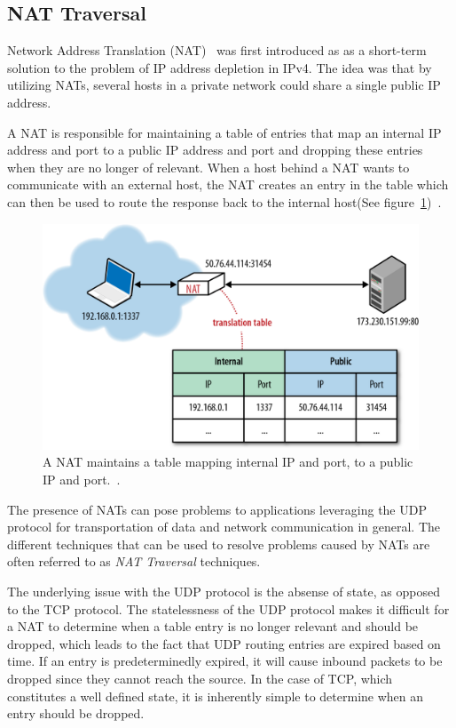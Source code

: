 \subsection{NAT Traversal}
\label{subsec:nattraversal}
Network Address Translation (NAT)~\cite{RFC1631:Online} was first introduced as as a short-term solution to the problem of IP address depletion in IPv4. The idea was that by utilizing NATs, several hosts in a private network could share a single public IP address.

A NAT is responsible for maintaining a table of entries that map an internal IP address and port to a public IP address and port and dropping these entries when they are no longer of relevant. When a host behind a NAT wants to communicate with an external host, the NAT creates an entry in the table which can then be used to route the response back to the internal host(See figure~\ref{fig:NAT})~\cite{RFC5245:Online}.

\begin{figure}[htp]
\centering
\includegraphics[width=\textwidth,height=0.2\paperheight,keepaspectratio
]{figures/nat}
\caption{A NAT maintains a table mapping internal IP and port, to a public IP and port.~\cite{NATIllustration:Online}.}
\label{fig:NAT}
\end{figure}

The presence of NATs can pose problems to applications leveraging the UDP protocol for transportation of data and network communication in general. The different techniques that can be used to resolve problems caused by NATs are often referred to as \emph{NAT Traversal} techniques.

The underlying issue with the UDP protocol is the absense of state, as opposed to the TCP protocol. The statelessness of the UDP protocol makes it difficult for a NAT to determine when a table entry is no longer relevant and should be dropped, which leads to the fact that UDP routing entries are expired based on time. If an entry is predeterminedly expired, it will cause inbound packets to be dropped since they cannot reach the source. In the case of TCP, which constitutes a well defined state, it is inherently simple to determine when an entry should be dropped.

